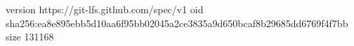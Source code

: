 version https://git-lfs.github.com/spec/v1
oid sha256:ea8e895ebb5d10aa6f95bb02045a2ce3835a9d650bcaf8b29685dd6769f4f7bb
size 131168
